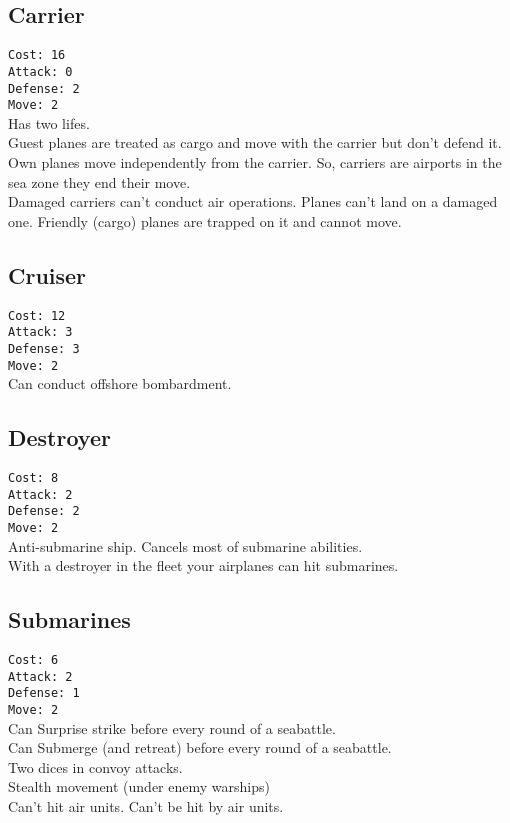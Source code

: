 \documentclass[10pt,a4paper,landscape]{article}
\begin{document}
\begin{multicols*}{3}
\subsection*{Carrier}
\texttt{Cost: 16 \\ Attack: 0 \\ Defense: 2 \\ Move: 2}
\\
Has two lifes.\\
Guest planes are treated as cargo and move with the carrier but don't defend it. Own planes move independently from the carrier. So, carriers are airports in the sea zone they end their move.\\
Damaged carriers can't conduct air operations. Planes can't land on a damaged one. Friendly (cargo) planes are trapped on it and cannot move.

\subsection*{Cruiser}
\texttt{Cost: 12 \\ Attack: 3 \\ Defense: 3 \\ Move: 2}
\\
Can conduct offshore bombardment.

\subsection*{Destroyer}
\texttt{Cost: 8 \\ Attack: 2 \\ Defense: 2 \\ Move: 2}
\\
Anti-submarine ship. Cancels most of submarine abilities.\\
With a destroyer in the fleet your airplanes can hit submarines.

\subsection*{Submarines}
\texttt{Cost: 6 \\ Attack: 2 \\ Defense: 1 \\ Move: 2}
\\
Can Surprise strike before every round of a seabattle.\\
Can Submerge (and retreat) before every round of a seabattle.\\
Two dices in convoy attacks.\\
Stealth movement (under enemy warships)\\
Can't hit air units. Can't be hit by air units.



\end{multicols*}
\end{document}
